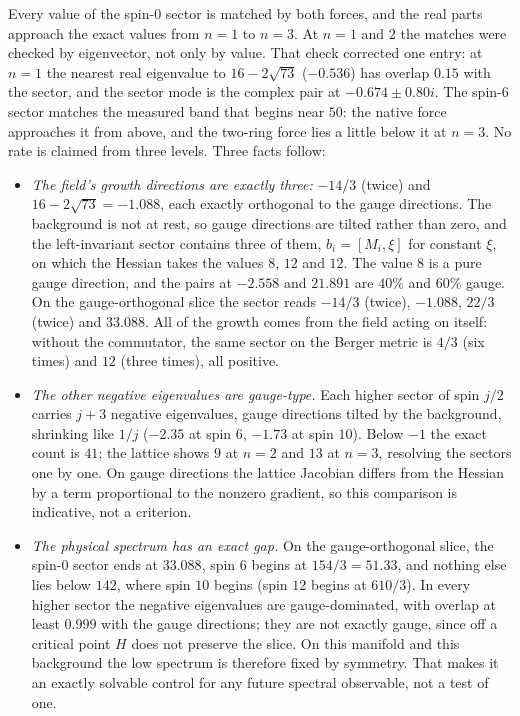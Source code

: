 \documentclass[11pt]{article}
\theoremstyle{definition}
\theoremstyle{remark}
\begin{document}
Every value of the spin-$0$ sector is matched by both forces, and the real parts approach the exact
values from $n=1$ to $n=3$. At $n=1$ and $2$ the matches were checked by eigenvector, not only by
value. That check corrected one entry: at $n=1$ the nearest real eigenvalue to $16-2\sqrt{73}$
($-0.536$) has overlap $0.15$ with the sector, and the sector mode is the complex pair at
$-0.674\pm0.80i$. The spin-$6$ sector matches the measured band that begins near $50$:
the native force approaches it from above, and the two-ring force lies a little below it at $n=3$.
No rate is claimed from three levels. Three facts follow:
\begin{itemize}
  \item \emph{The field's growth directions are exactly three:} $-14/3$ (twice) and
    $16-2\sqrt{73}=-1.088$, each exactly orthogonal to the gauge directions. The background is
    not at rest, so gauge directions are tilted rather than zero, and the left-invariant sector
    contains three of them, $b_i=[M_i,\xi]$ for constant $\xi$, on which the Hessian takes the
    values $8$, $12$ and $12$. The value $8$ is a pure gauge direction, and the pairs at $-2.558$
    and $21.891$ are $40\%$ and $60\%$ gauge. On the gauge-orthogonal slice the sector reads
    $-14/3$ (twice), $-1.088$, $22/3$ (twice) and $33.088$. All of the growth comes from the field
    acting on itself: without the commutator, the same sector on the Berger metric is $4/3$ (six
    times) and $12$ (three times), all positive.
  \item \emph{The other negative eigenvalues are gauge-type.} Each higher sector of spin $j/2$
    carries $j+3$ negative eigenvalues, gauge directions tilted by the background, shrinking
    like $1/j$ ($-2.35$ at spin $6$, $-1.73$ at spin $10$). Below $-1$ the exact count is $41$;
    the lattice shows $9$ at $n=2$ and $13$ at $n=3$, resolving the sectors one by one. On gauge
    directions the lattice Jacobian differs from the Hessian by a term proportional to the
    nonzero gradient, so this comparison is indicative, not a criterion.
  \item \emph{The physical spectrum has an exact gap.} On the gauge-orthogonal slice, the
    spin-$0$ sector ends at $33.088$, spin $6$ begins at $154/3=51.33$, and nothing else lies below
    $142$, where spin $10$ begins (spin $12$ begins at $610/3$). In every higher sector the negative
    eigenvalues are gauge-dominated, with overlap at least $0.999$ with the gauge directions; they
    are not exactly gauge, since off a critical point $H$ does not preserve the slice. On this
    manifold and this background the low spectrum is therefore fixed by symmetry. That makes it
    an exactly solvable control for any future spectral observable, not a test of one.
\end{itemize}
\end{document}
